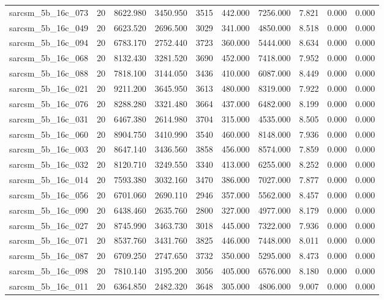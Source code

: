 \begin{tabular}{lrrrrrrrrr}
sarcsm\_5b\_16c\_073 & 20 & 8622.980 & 3450.950 & 3515 & 442.000 & 7256.000 & 7.821 & 0.000 & 0.000 \\
sarcsm\_5b\_16c\_049 & 20 & 6623.520 & 2696.500 & 3029 & 341.000 & 4850.000 & 8.518 & 0.000 & 0.000 \\
sarcsm\_5b\_16c\_094 & 20 & 6783.170 & 2752.440 & 3723 & 360.000 & 5444.000 & 8.634 & 0.000 & 0.000 \\
sarcsm\_5b\_16c\_068 & 20 & 8132.430 & 3281.520 & 3690 & 452.000 & 7418.000 & 7.952 & 0.000 & 0.000 \\
sarcsm\_5b\_16c\_088 & 20 & 7818.100 & 3144.050 & 3436 & 410.000 & 6087.000 & 8.449 & 0.000 & 0.000 \\
sarcsm\_5b\_16c\_021 & 20 & 9211.200 & 3645.950 & 3613 & 480.000 & 8319.000 & 7.922 & 0.000 & 0.000 \\
sarcsm\_5b\_16c\_076 & 20 & 8288.280 & 3321.480 & 3664 & 437.000 & 6482.000 & 8.199 & 0.000 & 0.000 \\
sarcsm\_5b\_16c\_031 & 20 & 6467.380 & 2614.980 & 3704 & 315.000 & 4535.000 & 8.505 & 0.000 & 0.000 \\
sarcsm\_5b\_16c\_060 & 20 & 8904.750 & 3410.990 & 3540 & 460.000 & 8148.000 & 7.936 & 0.000 & 0.000 \\
sarcsm\_5b\_16c\_003 & 20 & 8647.140 & 3436.560 & 3858 & 456.000 & 8574.000 & 7.859 & 0.000 & 0.000 \\
sarcsm\_5b\_16c\_032 & 20 & 8120.710 & 3249.550 & 3340 & 413.000 & 6255.000 & 8.252 & 0.000 & 0.000 \\
sarcsm\_5b\_16c\_014 & 20 & 7593.380 & 3032.160 & 3470 & 386.000 & 7027.000 & 7.877 & 0.000 & 0.000 \\
sarcsm\_5b\_16c\_056 & 20 & 6701.060 & 2690.110 & 2946 & 357.000 & 5562.000 & 8.457 & 0.000 & 0.000 \\
sarcsm\_5b\_16c\_090 & 20 & 6438.460 & 2635.760 & 2800 & 327.000 & 4977.000 & 8.179 & 0.000 & 0.000 \\
sarcsm\_5b\_16c\_027 & 20 & 8745.990 & 3463.730 & 3018 & 445.000 & 7322.000 & 7.936 & 0.000 & 0.000 \\
sarcsm\_5b\_16c\_071 & 20 & 8537.760 & 3431.760 & 3825 & 446.000 & 7448.000 & 8.011 & 0.000 & 0.000 \\
sarcsm\_5b\_16c\_087 & 20 & 6709.250 & 2747.650 & 3732 & 350.000 & 5295.000 & 8.473 & 0.000 & 0.000 \\
sarcsm\_5b\_16c\_098 & 20 & 7810.140 & 3195.200 & 3056 & 405.000 & 6576.000 & 8.180 & 0.000 & 0.000 \\
sarcsm\_5b\_16c\_011 & 20 & 6364.850 & 2482.320 & 3648 & 305.000 & 4806.000 & 9.007 & 0.000 & 0.000 \\

\end{tabular}
